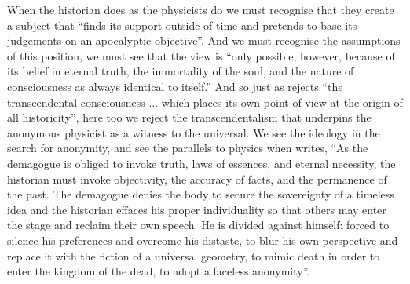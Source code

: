 %
When the historian does as the physicists do we  must recognise  that
they create a subject that  ``finds its support outside of time and pretends
to base its judgements on an apocalyptic objective''.  And we must
recognise the assumptions of this position, we must see that the view is 
 ``only possible, however, because of its belief in eternal truth,
the immortality of the soul, and the nature of consciousness as always
identical to itself.''
And so just as \cite*{FoucaultOrderOfThings} rejects ``the transcendental consciousness ... which
places its own point of view at the origin of all historicity'', 
here too we reject the transcendentalism %
that underpins
the anonymous physicist as a witness to the universal.
We see the ideology in the search for anonymity, and see the  parallels
to  physics when \cite*{FoucaultNietzcheGenealogyHistory} writes,
``As the demagogue is obliged to
invoke truth, laws of essences, and eternal necessity, the historian must
invoke objectivity, the accuracy of facts, and the permanence of the
past.  The demagogue denies the body to secure the sovereignty of a
timeless idea and the historian effaces his proper individuality so
that others may enter the stage and reclaim their own speech.  He is
divided against himself: forced to silence his preferences and overcome
his distaste, to blur his own perspective and replace it with the fiction
of a universal geometry, to mimic death in order to enter the kingdom of
the dead, to adopt a faceless anonymity''.



